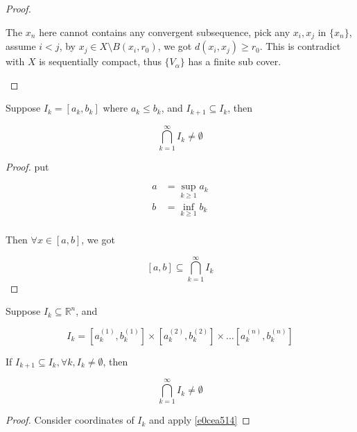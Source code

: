 \begin{proof}
\begin{enumerate}
The $x_n$ here cannot contains any convergent subsequence, pick any $x_i, x_j$ in $\{ x_n \}$,
assume $i < j$, by $x_j \in X \setminus B(x_i, r_0)$, we got $d(x_i, x_j) \ge r_0$.
This is contradict with $X$ is sequentially compact, thus $\{V_\alpha\}$ has a finite sub cover.

    \end{enumerate}

\end{proof}


\begin{thm}\label{e0cea514}
    Suppose $I_k = [a_k, b_k]$ where $a_k \le b_k$, and $I_{k+1} \subseteq I_k$, then

    \[
        \bigcap_{k=1}^{\infty} I_k \ne \emptyset
    \]
\end{thm}

\begin{proof}
    put 
    
    \begin{align*}
        a &= \sup_{k \ge 1} a_k \\
        b &= \inf_{k \ge 1} b_k \\
    \end{align*}

    Then $\forall x \in [a,b]$, we got 

    \[
        [a,b] \subseteq \bigcap_{k=1}^{\infty}I_k
    \]
\end{proof}

\begin{corollary}
    Suppose $I_k \subseteq \mathbb{R}^n$, and

    \[
        I_k = [a^{(1)}_k, b^{(1)}_k] \times [a^{(2)}_k, b^{(2)}_k] \times \dots [a^{(n)}_k, b^{(n)}_k]
    \]

    If $I_{k+1} \subseteq I_{k}, \forall k, I_k \ne \emptyset$, then 

    \[
        \bigcap_{k=1}^{\infty} I_k \ne \emptyset
    \]
\end{corollary}

\begin{proof}
    Consider coordinates of $I_k$ and apply \cref{e0cea514}
\end{proof}

